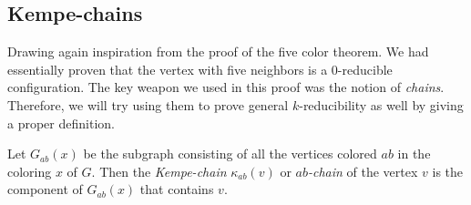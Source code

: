 \subsection{Kempe-chains}

Drawing again inspiration from the proof of the five color theorem. We had essentially proven that the vertex with five neighbors is a 0-reducible configuration. The key weapon we used in this proof was the notion of \textit{chains}. Therefore, we will try using them to prove general $k$-reducibility as well by giving a proper definition.

\begin{definition}
    Let $G_{ab}(x)$ be the subgraph consisting of all the vertices colored $ab$ in the coloring $x$ of $G$.
    Then the \emph{Kempe-chain} $\kappa_{ab}(v)$ or \emph{$ab$-chain} of the vertex $v$ is the component of $G_{ab}(x)$ that contains $v$. 
\end{definition}

